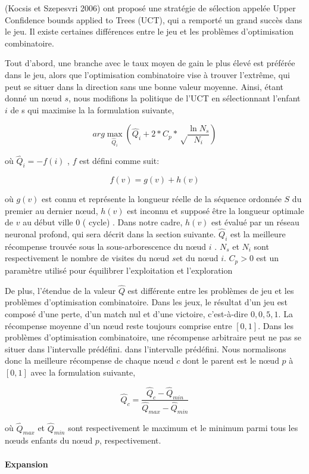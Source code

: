 \documentclass[]{article}
\let\oldparagraph\paragraph
\renewcommand{\paragraph}[1]{\oldparagraph{#1}\mbox{}}
\begin{document}
(Kocsis et Szepesvri 2006) ont proposé une stratégie de sélection
appelée Upper Confidence bounds applied to Trees (UCT), qui a remporté
un grand succès dans le jeu. Il existe certaines différences entre le
jeu et les problèmes d'optimisation combinatoire.

Tout d'abord, une branche avec le taux moyen de gain le plus élevé est
préférée dans le jeu, alors que l'optimisation combinatoire vise à
trouver l'extrême, qui peut se situer dans la direction sans une bonne
valeur moyenne. Ainsi, étant donné un nœud \(s\), nous modifions la
politique de l'UCT en sélectionnant l'enfant \(i\) de s qui maximise la
la formulation suivante,

\[arg\max_{\hat{Q}_i}(\hat{Q}_i+2*C_p*\sqrt\frac{\ln N_s}{N_i})\]

où \(\hat{Q}_i = -f (i)\) , \(f\) est défini comme suit:

\[f(v)=g(v)+h(v)\]

où \(g(v)\) est connu et représente la longueur réelle de la séquence
ordonnée \(S\) du premier au dernier nœud, \(h(v)\) est inconnu et
supposé être la longueur optimale de \(v\) au début ville 0 ( cycle) .
Dans notre cadre, \(h(v)\) est évalué par un réseau neuronal profond,
qui sera décrit dans la section suivante. \(\hat{Q}_i\) est la meilleure
récompense trouvée sous la sous-arborescence du nœud \(i\) . \(N_s \) et
\(N_i\) sont respectivement le nombre de visites du nœud \(s \)et du
nœud \(i\). \(C_p > 0\) est un paramètre utilisé pour équilibrer
l'exploitation et l'exploration

De plus, l'étendue de la valeur \(\hat{Q}\) est différente entre les
problèmes de jeu et les problèmes d'optimisation combinatoire. Dans les
jeux, le résultat d'un jeu est composé d'une perte, d'un match nul et
d'une victoire, c'est-à-dire \({0, 0,5, 1}\). La récompense moyenne d'un
nœud reste toujours comprise entre \([0 , 1]\). Dans les problèmes
d'optimisation combinatoire, une récompense arbitraire peut ne pas se
situer dans l'intervalle prédéfini. dans l'intervalle prédéfini. Nous
normalisons donc la meilleure récompense de chaque nœud \(c\) dont le
parent est le nœud \(p\) à \( [0,1] \) avec la formulation suivante,

\[\hat{Q}_c = \frac{\hat{Q}_c-\hat{Q}_{min}}{\hat{Q}_{max}-\hat{Q}_{min}}\]

où \(\hat{Q}_{max}\) et \(\hat{Q}_{min}\) sont respectivement le maximum
et le minimum parmi tous les nœuds enfants du nœud \(p\),
respectivement.

\hypertarget{expansion-2}{%
\paragraph{Expansion}\label{expansion-2}}
\end{document}
